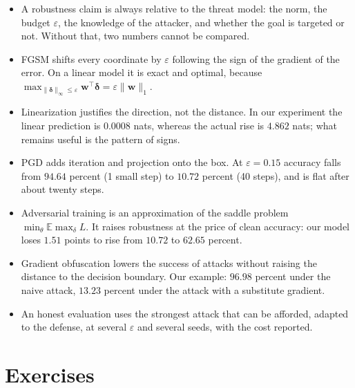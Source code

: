 \begin{ringkasan}
\begin{itemize}
  \item A robustness claim is always relative to the threat model: the norm, the
        budget $\varepsilon$, the knowledge of the attacker, and whether the goal is
        targeted or not. Without that, two numbers cannot be compared.
  \item FGSM shifts every coordinate by $\varepsilon$ following the sign of the
        gradient of the error. On a linear model it is exact and optimal, because
        $\max_{\lVert\boldsymbol{\delta}\rVert_\infty\le\varepsilon}
        \mathbf{w}^{\top}\boldsymbol{\delta}=\varepsilon\lVert\mathbf{w}\rVert_1$.
  \item Linearization justifies the direction, not the distance. In our experiment the
        linear prediction is $0.0008$ nats, whereas the actual rise is $4.862$ nats;
        what remains useful is the pattern of signs.
  \item PGD adds iteration and projection onto the box. At $\varepsilon=0.15$
        accuracy falls from $94.64$ percent (1 small step) to $10.72$ percent
        (40 steps), and is flat after about twenty steps.
  \item Adversarial training is an approximation of the saddle problem
        $\min_\theta\mathbb{E}\max_\delta L$. It raises robustness at the price of
        clean accuracy: our model loses $1.51$ points to rise from $10.72$
        to $62.65$ percent.
  \item Gradient obfuscation lowers the success of attacks without raising the distance
        to the decision boundary. Our example: $96.98$ percent under the naive
        attack, $13.23$ percent under the attack with a substitute gradient.
  \item An honest evaluation uses the strongest attack that can be afforded, adapted
        to the defense, at several $\varepsilon$ and several seeds, with the cost
        reported.
\end{itemize}
\end{ringkasan}

\section{Exercises}

